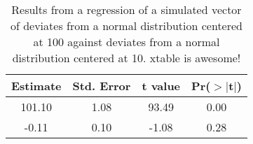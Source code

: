 \begin{table}[ht]
\centering
\caption{Results from a regression of a simulated vector of deviates from a normal distribution centered at 100 against deviates from a normal distribution centered at 10. xtable is awesome!} 
\label{table:lm_results}
\begin{tabular}{cccc}
  \hline
Estimate & Std. Error & t value & Pr($>$$|$t$|$) \\ 
  \hline
101.10 & 1.08 & 93.49 & 0.00 \\ 
  -0.11 & 0.10 & -1.08 & 0.28 \\ 
   \hline
\end{tabular}
\end{table}
